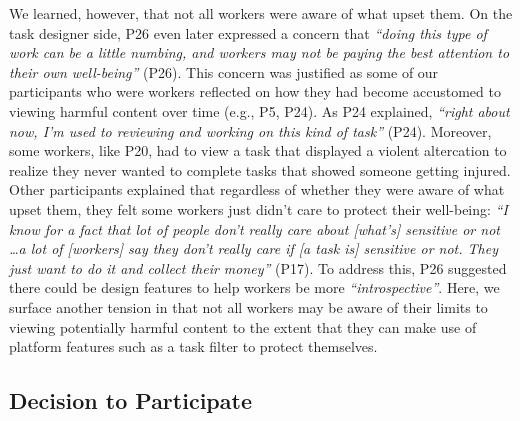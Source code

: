 We learned, however, that not all workers were aware of what upset them. On the task designer side, P26 even later expressed a concern that \textit{``doing this type of work can be a little numbing, and workers may not be paying the best attention to their own well-being''} (P26). This concern was justified as some of our participants who were workers reflected on how they had become accustomed to viewing harmful content over time (e.g., P5, P24). As P24 explained, \textit{``right about now, I'm used to reviewing and working on this kind of task''} (P24). Moreover, some workers, like P20, had to view a task that displayed a violent altercation to realize they never wanted to complete tasks that showed someone getting injured. Other participants explained that regardless of whether they were aware of what upset them, they felt some workers just didn't care to protect their well-being: \textit{``I know for a fact that lot of people don't really care about [what's] sensitive or not \dots a lot of [workers] say they don't really care if [a task is] sensitive or not. They just want to do it and collect their money''} (P17). To address this, P26 suggested there could be design features to help workers be more \textit{``introspective''}. Here, we surface another tension in that not all workers may be aware of their limits to viewing potentially harmful content to the extent that they can make use of platform features such as a task filter to protect themselves.

\subsection{Decision to Participate}
